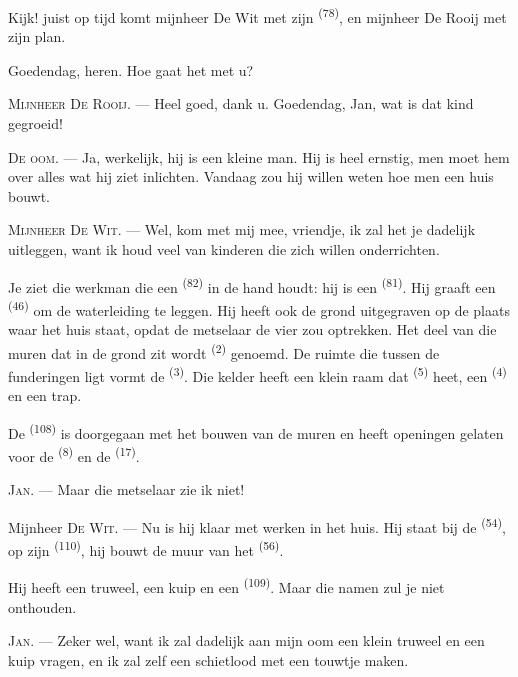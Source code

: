 Kijk! juist op tijd komt mijnheer De Wit met zijn  \textsuperscript{(78)}, en
mijnheer De Rooij met zijn plan.

Goedendag, heren. Hoe gaat het met u?

\textsc{Mijnheer De Rooij}. --- Heel goed, dank u. Goedendag, Jan, wat is dat kind gegroeid!

\textsc{De oom}. --- Ja, werkelijk, hij is een kleine man. Hij is heel ernstig, men moet hem
over alles wat hij ziet inlichten. Vandaag zou hij willen weten hoe men een huis bouwt.

\VUsaut{3.0mm}

\textsc{Mijnheer De Wit}. --- Wel, kom met mij mee, vriendje, ik zal het je dadelijk
uitleggen, want ik houd veel van kinderen die zich willen onderrichten.

Je ziet die werkman die een  \textsuperscript{(82)} in de hand houdt: hij is een
 \textsuperscript{(81)}. Hij graaft een
 \textsuperscript{(46)} om de waterleiding te leggen. Hij heeft
ook de grond uitgegraven op de plaats waar het huis staat, opdat de metselaar de vier
 zou optrekken. Het deel van die muren dat in de grond zit wordt
 \textsuperscript{(2)} genoemd. De ruimte die tussen de funderingen ligt
vormt de  \textsuperscript{(3)}. Die kelder heeft een klein raam dat
 \textsuperscript{(5)} heet, een
 \textsuperscript{(4)} en een trap.

De  \textsuperscript{(108)} is doorgegaan met het bouwen van de muren en
heeft openingen gelaten voor de  \textsuperscript{(8)} en de 
\textsuperscript{(17)}.

\textsc{Jan}. --- Maar die metselaar zie ik niet!

Mijnheer \textsc{De Wit}. --- Nu is hij klaar met werken in het huis. Hij staat bij de
 \textsuperscript{(54)}, op zijn  \textsuperscript{(110)},
hij bouwt de muur van het  \textsuperscript{(56)}.

Hij heeft een truweel, een kuip en een  \textsuperscript{(109)}. Maar die
namen zul je niet onthouden.

\textsc{Jan}. --- Zeker wel, want ik zal dadelijk aan mijn oom een klein truweel en een kuip
vragen, en ik zal zelf een schietlood met een touwtje maken.

